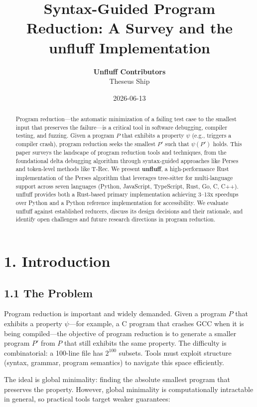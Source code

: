 \documentclass[
  letterpaper,
]{article}
\title{Syntax-Guided Program Reduction: A Survey and the unfluff
Implementation}
\author{
\textbf{Unfluff Contributors}%
\\%
%
    Theseus Ship\\%
%
}
\date{2026-06-13}
\begin{document}
\maketitle
\begin{abstract}
Program reduction---the automatic minimization of a failing test case to
the smallest input that preserves the failure---is a critical tool in
software debugging, compiler testing, and fuzzing. Given a program \(P\)
that exhibits a property \(\psi\) (e.g., triggers a compiler crash),
program reduction seeks the smallest \(P'\) such that \(\psi(P')\)
holds. This paper surveys the landscape of program reduction tools and
techniques, from the foundational delta debugging algorithm through
syntax-guided approaches like Perses and token-level methods like T-Rec.
We present \textbf{unfluff}, a high-performance Rust implementation of
the Perses algorithm that leverages tree-sitter for multi-language
support across seven languages (Python, JavaScript, TypeScript, Rust,
Go, C, C++). unfluff provides both a Rust-based primary implementation
achieving 3--13x speedups over Python and a Python reference
implementation for accessibility. We evaluate unfluff against
established reducers, discuss its design decisions and their rationale,
and identify open challenges and future research directions in program
reduction.
\end{abstract}



\section{1. Introduction}\label{introduction}

\subsection{1.1 The Problem}\label{the-problem}

Program reduction is important and widely demanded. Given a program
\(P\) that exhibits a property \(\psi\)---for example, a C program that
crashes GCC when it is being compiled---the objective of program
reduction is to generate a smaller program \(P'\) from \(P\) that still
exhibits the same property. The difficulty is combinatorial: a 100-line
file has \(2^{100}\) subsets. Tools must exploit structure (syntax,
grammar, program semantics) to navigate this space efficiently.

The ideal is global minimality: finding the absolute smallest program
that preserves the property. However, global minimality is
computationally intractable in general, so practical tools target weaker
guarantees:
\end{document}
